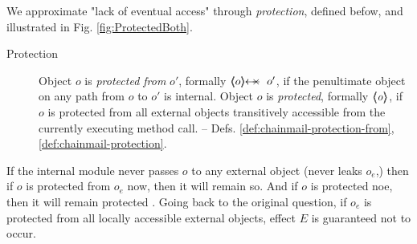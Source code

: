 We approximate "lack of eventual access" through \emph{protection}, defined befow, and illustrated in %
Fig.  \ref{fig:ProtectedBoth}.  %

 \begin{description}
\item[Protection] Object $o$ is \emph{protected  from} $o'$, formally $\protectedFrom {o} {o'}$,  
 if the penultimate object on any path from $o$ to $o'$  is internal.
Object $o$ is \emph{protected}, formally ${\langle\!\!\langle \mbox{\normalfont{\texttt{\it{o}}}} \rangle\!\!\rangle}$, if $o$ is protected from all external objects transitively accessible from the currently executing method call. %
-- \cf Defs. \ref{def:chainmail-protection-from}, \ %
\ref{def:chainmail-protection}.
 \end{description}
 


If the  internal module  never passes $o$ to any external object (\ie never leaks $o_e$,) then  if $o$ is protected from $o_e$ now, then it will remain so.
And if $o$ is protected noe, then it will remain protected .
Going back to the original question, if $o_e$ is protected from all locally accessible external objects, effect  $E$ is guaranteed not to occur.






